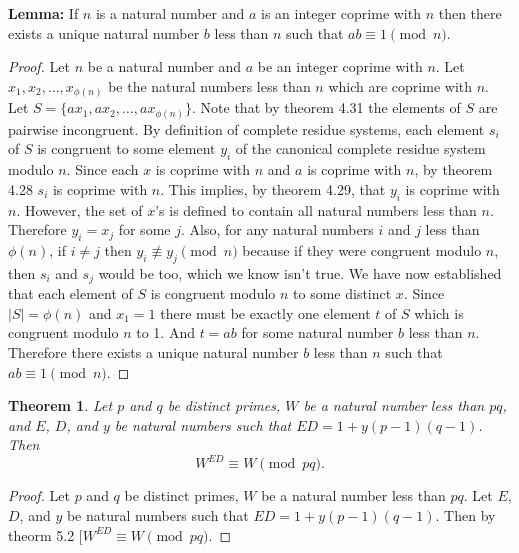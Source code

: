\documentclass[12pt,leqno]{article}
\numberwithin{equation}{section}
\newtheorem{thm}{Theorem}[section]
\theoremstyle{definition}
\newcommand{\card}[1]{\left| #1 \right|}
\begin{document}
\textbf{Lemma:} If $n$ is a natural number and $a$ is an integer coprime with $n$ then there exists a unique natural number $b$ less than $n$ such that $ab \equiv 1 \pmod{n}$.
\begin{proof}[Proof]
Let $n$ be a natural number and $a$ be an integer coprime with $n$.  Let $x_1, x_2, \dots , x_{\phi(n)}$ be the natural numbers less than $n$ which are coprime with $n$.  Let $S = \{ax_1, ax_2, \dots , ax_{\phi(n)}\}$. Note that by theorem 4.31 the elements of $S$ are pairwise incongruent. By definition of complete residue systems, each element $s_i$ of $S$ is congruent to some element $y_i$ of the canonical complete residue system modulo $n$.  Since each $x$ is coprime with $n$ and $a$ is coprime with $n$, by theorem 4.28 $s_i$ is coprime with $n$.  This implies, by theorem 4.29, that $y_i$ is coprime with $n$.  However, the set of $x$'s is defined to contain all natural numbers less than $n$.  Therefore $y_i = x_j$ for some $j$.  Also, for any natural numbers $i$ and $j$ less than $\phi(n)$, if $i \neq j$ then $y_i \not \equiv y_j \pmod{n}$ because if they were congruent modulo $n$, then $s_i$ and $s_j$ would be too, which we know isn't true.  We have now established that each element of $S$ is congruent modulo $n$ to some distinct $x$.  Since $\card{S} = \phi(n)$ and $x_1 = 1$ there must be exactly one element $t$ of $S$ which is congruent modulo $n$ to 1.  And $t = ab$ for some natural number $b$ less than $n$.  Therefore there exists a unique natural number $b$ less than $n$ such that $ab \equiv 1 \pmod{n}$.
\end{proof}

\begin{thm}
Let $p$ and $q$ be distinct primes, $W$ be a natural number less
than $pq$, and $E$, $D$, and $y$ be natural numbers such that
$ED=1+y(p-1)(q-1)$. Then
\[W^{ED}\equiv W\pmod{pq}.\]
\end{thm}
\begin{proof}[Proof]
Let $p$ and $q$ be distinct primes, $W$ be a natural number less than $pq$.  Let $E$, $D$, and $y$ be natural numbers such that $ED=1+y(p-1)(q-1)$.  Then by theorm 5.2 $[W^{ED}\equiv W\pmod{pq}$.
\end{proof}
\end{document}
